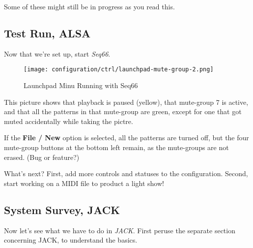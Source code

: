   Some of these might still be in progress as you read this.

\subsection{Test Run, ALSA}
\label{subsubsec:launchpad_mini_test_run_alsa}

   Now that we're set up, start \textsl{Seq66}.

\begin{figure}[H]
   \centering 
   \texttt{[image: configuration/ctrl/launchpad-mute-group-2.png]}
   \caption{Launchpad Minu Running with Seq66}
   \label{fig:launchpad_mute_group_perspective}
\end{figure}

   This picture shows that playback is paused (yellow), that mute-group 7 is
   active, and that all the patterns in that mute-group are green, except for one
   that got muted accidentally while taking the pictre.

   If the \textbf{File / New} option is selected, all the patterns are turned off,
   but the four mute-group buttons at the bottom left remain, as the mute-groups
   are not erased.  (Bug or feature?)

   What's next?  First, add more controls and statuses to the configuration.
   Second, start working on a MIDI file to product a light show!

\subsection{System Survey, JACK}
\label{subsec:launchpad_mini_survey_jack}

   Now let's see what we have to do in \textsl{JACK}.
   First peruse the separate section concerning JACK, to understand the basics.


